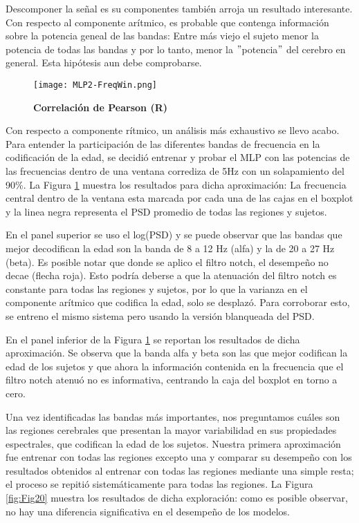 \documentclass[11pt,letterpaper]{article}
\numberwithin{equation}{subsection}
\numberwithin{table}{subsection}
\begin{document}
\bigskip
\noindent Descomponer la señal es su componentes también arroja un resultado interesante. Con respecto al componente arítmico, es probable que contenga información sobre la potencia geneal de las bandas: Entre más viejo el sujeto menor la potencia de todas las bandas y por lo tanto, menor la $"$potencia$"$ del cerebro en general. Esta hipótesis aun debe comprobarse.

 


 \bigskip
\begin{figure}[H]
\centering
	\texttt{[image: MLP2-FreqWin.png]}
	\captionsetup{labelfont=bf}
	\caption{\scriptsize \textbf {Correlación de Pearson (R)} }
	\label{fig:Fig19}
\end{figure} 

\bigskip
\noindent Con respecto a componente rítmico, un análisis más exhaustivo se llevo acabo. Para entender la participación de las diferentes bandas de frecuencia en la codificación de la edad, se decidió entrenar y probar el MLP con las potencias de las frecuencias dentro de una ventana corrediza de 5Hz con un solapamiento del 90\%. La Figura \ref{fig:Fig19} muestra los resultados para dicha aproximación: La frecuencia central dentro de la ventana esta marcada por cada una de las cajas en el boxplot y la linea negra representa el PSD promedio de todas las regiones y sujetos.

\bigskip
\noindent En el panel superior se uso el log(PSD) y se puede observar que las bandas que mejor decodifican la edad son la banda de 8 a 12 Hz (alfa) y la de 20 a 27 Hz (beta). Es posible notar que donde se aplico el filtro notch, el desempeño no decae (flecha roja). Esto podría deberse a que la atenuación del filtro notch es constante para todas las regiones y sujetos, por lo que la varianza en el componente arítmico que codifica la edad, solo se desplazó. Para corroborar esto, se entreno el mismo sistema pero usando la versión blanqueada del PSD. 

\bigskip
\noindent En el panel inferior de la Figura \ref{fig:Fig19} se reportan los resultados de dicha aproximación. Se observa que la banda alfa y beta son las que mejor codifican la edad de los sujetos y que ahora la información contenida en la frecuencia que el filtro notch atenuó no es informativa, centrando la caja del boxplot en torno a cero. 

\noindent 
\bigskip Una vez identificadas las bandas más importantes, nos preguntamos cuáles son las regiones cerebrales que presentan la mayor variabilidad en sus propiedades espectrales, que codifican la edad de los sujetos. Nuestra primera aproximación fue entrenar con todas las regiones excepto una y comparar su desempeño con los resultados obtenidos al entrenar con todas las regiones mediante una simple resta; el proceso se repitió sistemáticamente para todas las regiones. La Figura \ref{fig:Fig20} muestra los resultados de dicha exploración: como es posible observar, no hay una diferencia significativa en el desempeño de los modelos. 
\end{document}
